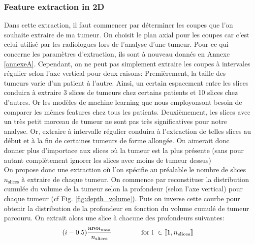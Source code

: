 \documentclass[10pt]{article}
\begin{document}
\subsubsection{Feature extraction in 2D}
Dans cette extraction, il faut commencer par déterminer les coupes que l'on souhaite extraire de ma tumeur. On choisit le plan axial pour les coupes car c'est celui utilisé par les radiologues lors de l'analyse d'une tumeur. Pour ce qui concerne les paramètres d'extraction, ils sont à nouveau donnés en Annexe \ref{annexeA}. Cependant, on ne peut pas simplement extraire les coupes à intervales régulier selon l'axe vertical pour deux raisons:
\indent Premièrement, la taille des tumeurs varie d'un patient à l'autre. Ainsi, un certain espacement entre les slices conduira à extraire 3 slices de tumeurs chez certains patients et 10 slices chez d'autres. Or les modèles de machine learning que nous employonsont besoin de comparer les mêmes features chez tous les patients. Deuxièmement, les slices avec un très petit morceau de tumeur ne sont pas très significatives pour notre analyse. Or, extraire à intervalle régulier conduira à l'extraction de telles slices au début et à la fin de certaines tumeurs de forme allongée. On aimerait donc donner plus d'importace aux slices où la tumeur est la plus présente (sans pour autant complètement ignorer les slices avec moins de tumeur dessus)\\
On propose donc une extraction où l'on spécifie au préalable le nombre de slices $n_{\text{slices}}$ à extraire de chaque tumeur. On commence par reconstituer la distribution cumulée du volume de la tumeur selon la profondeur (selon l'axe vertical) pour chaque tumeur (cf Fig. \ref{fig:depth_volume}). Puis on inverse cette courbe pour obtenir la distribution de la profondeur en fonction du volume cumulé de tumeur parcouru. On extrait alors une slice à chacune des profondeurs suivantes:
\begin{equation}
(i-0.5) \displaystyle{\frac{\text{area}_{\text{max}}}{n_{\text{slices}}}} \hspace{1.5 cm} \text{for i } \in \llbracket 1,n_{\text{slices}}  \rrbracket
\end{equation}
\end{document}
